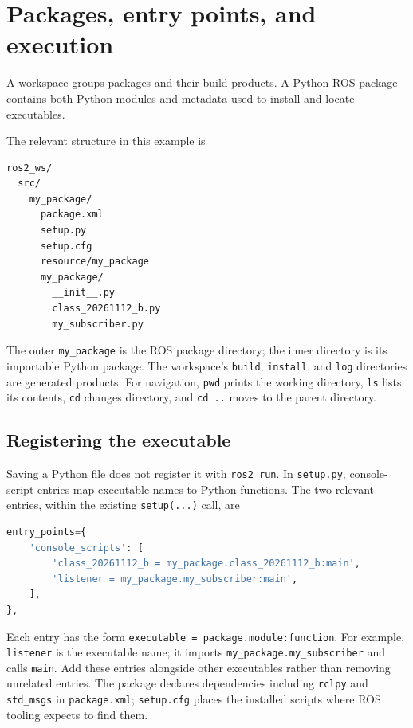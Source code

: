 \section{Packages, entry points, and execution}
\label{sec:l14-running}
A workspace groups packages and their build products. A Python ROS package
contains both Python modules and metadata used to install and locate
executables.

\begin{minipage}{\linewidth}
The relevant structure in this example is
\begin{lstlisting}[style=robotcode]
ros2_ws/
  src/
    my_package/
      package.xml
      setup.py
      setup.cfg
      resource/my_package
      my_package/
        __init__.py
        class_20261112_b.py
        my_subscriber.py
\end{lstlisting}
\end{minipage}

The outer \texttt{my\_package} is the ROS package directory; the inner
directory is its importable Python package. The workspace's \texttt{build},
\texttt{install}, and \texttt{log} directories are generated products.
For navigation, \texttt{pwd} prints the working directory, \texttt{ls}
lists its contents, \texttt{cd} changes directory, and \texttt{cd ..}
moves to the parent directory.

\subsection{Registering the executable}
Saving a Python file does not register it with \texttt{ros2 run}.
In \texttt{setup.py}, console-script entries map executable names to
Python functions. The two
relevant entries, within the existing \texttt{setup(...)} call, are
\begin{lstlisting}[style=robotcode,language=Python]
entry_points={
    'console_scripts': [
        'class_20261112_b = my_package.class_20261112_b:main',
        'listener = my_package.my_subscriber:main',
    ],
},
\end{lstlisting}
Each entry has the form \texttt{executable = package.module:function}.
For example, \texttt{listener} is the executable name; it imports
\texttt{my\_package.my\_subscriber} and calls \texttt{main}. Add these
entries alongside other executables rather than removing unrelated entries.
The package declares dependencies including \texttt{rclpy} and
\texttt{std\_msgs} in \texttt{package.xml}; \texttt{setup.cfg} places
the installed scripts where ROS tooling expects to find them.

